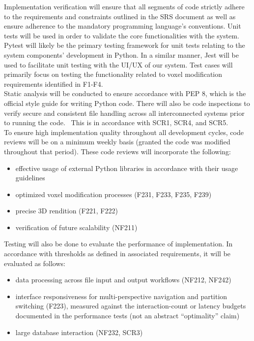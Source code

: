 \documentclass[12pt, titlepage]{article}
\begin{document}
\noindent Implementation verification will ensure that all segments of code strictly adhere to the requirements and constraints outlined in the SRS document as well as ensure adherence to the mandatory programming language’s conventions. Unit tests will be used in order to validate the core functionalities with the system. Pytest will likely be the primary testing framework for unit tests relating to the system components' development in Python. In a similar manner, Jest will be used to facilitate unit testing with the UI/UX of our system. Test cases will primarily focus on testing the functionality related to voxel modification requirements identified in F1-F4.\\

\noindent Static analysis will be conducted to ensure accordance with PEP 8, which is the official style guide for writing Python code. There will also be code inspections to verify secure and consistent file handling across all interconnected systems prior to running the code.  This is in accordance with SCR1, SCR4, and SCR5.\\

\noindent To ensure high implementation quality throughout all development cycles, code reviews will be on a minimum weekly basis (granted the code was modified throughout that period). These code reviews will incorporate the following:
\begin{itemize}
\item effective usage of external Python libraries in accordance with their usage guidelines
\item optimized voxel modification processes (F231, F233, F235, F239)
\item precise 3D rendition (F221, F222)
\item verification of future scalability (NF211)
\end{itemize}

\noindent Testing will also be done to evaluate the performance of implementation. In accordance with thresholds as defined in associated requirements, it will be evaluated as follows:
\begin{itemize}
\item data processing across file input and output workflows (NF212, NF242)
\item interface responsiveness for multi-perspective navigation and partition switching (F223), measured against the interaction-count or latency budgets documented in the performance tests (not an abstract ``optimality'' claim)
\item large database interaction (NF232, SCR3)
\end{itemize}
\end{document}
